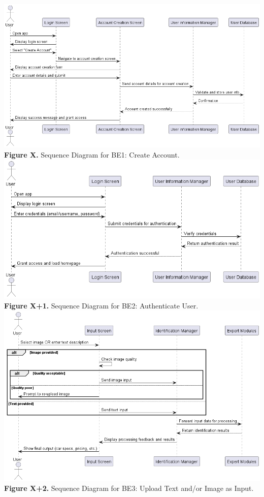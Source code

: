 \documentclass[]{article}
\begin{document}
\begin{center}
	\includegraphics[scale=0.5]{Sequence Diagrams/BE1_Sequence_Diagram.png}\\
	\textbf{Figure X.} Sequence Diagram for BE1: Create Account.\\

	\includegraphics[scale=0.6]{Sequence Diagrams/BE2_Sequence_Diagram.png}\\
	\textbf{Figure X+1.} Sequence Diagram for BE2: Authenticate User.\\

	\includegraphics[scale=0.55]{Sequence Diagrams/BE3_Sequence_Diagram.png}\\
	\textbf{Figure X+2.} Sequence Diagram for BE3: Upload Text and/or Image as Input.\\


\end{center}
\end{document}
